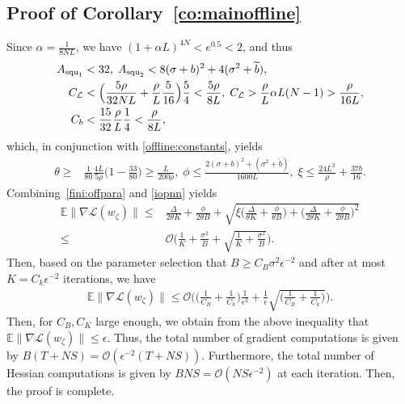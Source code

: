 \documentclass{osudissert96}
\begin{document}
\subsection*{Proof of Corollary~\ref{co:mainoffline}}
	Since $\alpha = \frac{1}{8NL}$, we have $(1+\alpha L)^{4N}< e^{0.5}<2$, and thus
	\begin{align}\label{afterpuck}
	A_{\text{\normalfont squ}_1}  &<  32, \; A_{\text{\normalfont squ}_2} < 8(\sigma +b)^2 + 4(\sigma^2+\widetilde b),\nonumber
	\\C_{\mathcal{L}} &< \Big(\frac{5\rho}{32NL} + \frac{\rho}{L}\frac{5}{16}\Big) \frac{5}{4} < \frac{5\rho}{8L}, \; C_{\mathcal{L}} > \frac{\rho}{L} \alpha L (N-1)>\frac{\rho}{16L},\nonumber
	\\C_b &< \frac{15}{32}\frac{\rho}{L}\frac{1}{4}< \frac{\rho}{8L},
	\end{align}
	which, in conjunction with \cref{offline:constants}, yields
	\begin{align}\label{fini:offpara}
	\theta \geq &  \frac{1}{80} \frac{4L}{5\rho} \Big( 1- \frac{33}{80}\Big) \geq \frac{L}{200\rho}, \; \phi \leq \frac{2(\sigma +b)^2 + (\sigma^2+\widetilde b)}{1600L},\; \xi \leq  \frac{24L^2}{\rho} + \frac{37b}{16}. 
	\end{align}
	Combining~\cref{fini:offpara} and \cref{iopnn} yields
	\begin{align*}
	\mathbb{E}\|\nabla \mathcal{L}(w_\zeta)\| \leq &\frac{\Delta}{2\theta K} +\frac{\phi}{2\theta B} + \sqrt{ \xi \Big(\frac{\Delta}{\theta K} +\frac{\phi}{\theta B}\Big) + \Big(\frac{\Delta}{2\theta K} +\frac{\phi}{2\theta B}\Big)^2 } \nonumber
	\\ \leq & \mathcal{O}\Big(  \frac{1}{K} +\frac{\sigma^2}{B} +\sqrt{\frac{1}{K} +\frac{\sigma^2}{B} }  \Big).
	\end{align*}
	Then, based on the parameter selection that $B\geq C_B\sigma^2\epsilon^{-2}$ and after at most $K=C_k\epsilon^{-2}$ iterations, we have 
	\begin{align*}
	\mathbb{E}\|\nabla \mathcal{L}(w_\zeta)\| \leq \mathcal{O}\Big(\big(\frac{1}{C_B}+\frac{1}{C_k}\big)\frac{1}{\epsilon^2} + \frac{1}{\epsilon}\sqrt{\big(\frac{1}{C_B}+\frac{1}{C_k}\big)}\Big).
	\end{align*}	
	Then, for $C_B,C_K$ large enough, we obtain from the above inequality that 
$	\mathbb{E}\|\nabla \mathcal{L}(w_\zeta)\| \leq \epsilon.$
	Thus, the total number of gradient computations is given by $B(T+NS)=\mathcal{O}(\epsilon^{-2}(T+NS)).$ Furthermore, the  total number of Hessian computations is given by $BNS =\mathcal{O}(NS\epsilon^{-2}) $
at each iteration.  
	Then, the proof is complete.
\end{document}
